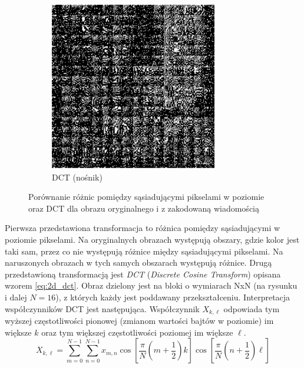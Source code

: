 \begin{figure}[h]
\begin{subfigure}{0.3\textwidth}
                \includegraphics[width=\textwidth]{img/dct_stego.png}
                \caption{DCT (nośnik)}
            \end{subfigure}
        
            \caption{Porównanie różnic pomiędzy sąsiadującymi pikselami w poziomie oraz DCT dla obrazu oryginalnego i z zakodowaną wiadomością}
            \label{compare_dct_diff}
        \end{figure}
        
        Pierwsza przedstawiona transformacja to różnica pomiędzy sąsiadującymi w poziomie pikselami. Na oryginalnych obrazach występują obszary, gdzie kolor jest taki sam, przez co nie występują różnice między sąsiadującymi pikselami. Na naruszonych obrazach w tych samych obszarach występują różnice. Drugą przedstawioną transformacją jest \textit{DCT} (\textit{Discrete Cosine Transform}) opisana wzorem \ref{eq:2d_dct}. Obraz dzielony jest na bloki o wymiarach NxN (na rysunku i dalej $N=16$), z których każdy jest poddawany przekształceniu. Interpretacja współczynników DCT jest następująca. Współczynnik $X_{k,\ell}$ odpowiada tym wyższej częstotliwości pionowej (zmianom wartości bajtów w poziomie) im większe $k$ oraz tym większej częstotliwości poziomej im większe $\ell$.
        \begin{equation}
            X_{k,\ell} = \sum_{m=0}^{N-1} \sum_{n=0}^{N-1} x_{m,n} \cos \left[ \frac{\pi}{N} \left(m + \frac{1}{2}\right) k \right] \cos \left[ \frac{\pi}{N} \left(n + \frac{1}{2}\right) \ell \right]
        \label{eq:2d_dct}
        \end{equation}

